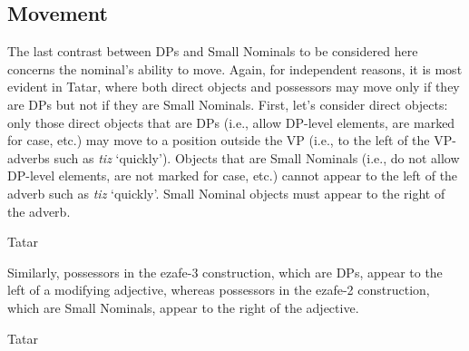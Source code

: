\documentclass[output=paper]{langsci/langscibook}
\begin{document}
\subsection{Movement}  %

The last contrast between DPs and Small Nominals to be considered here concerns the nominal’s ability to move. Again, for independent reasons, it is most evident in Tatar, where both direct objects and possessors may move only if they are DPs but not if they are Small Nominals. First, let’s consider direct objects: only those direct objects that are DPs (i.e., allow DP-level elements, are marked for case, etc.) may move to a position outside the VP (i.e., to the left of the VP-adverbs such as \textit{tiz} ‘quickly’). Objects that are Small Nominals (i.e., do not allow DP-level elements, are not marked for case, etc.) cannot appear to the left of the adverb such as \textit{tiz} ‘quickly’. Small Nominal objects must appear to the right of the adverb.

\ea%
    \label{pereex:17}
    Tatar 
    \z 
\z 

Similarly, possessors in the ezafe-3 construction, which are DPs, appear to the left of a modifying adjective, whereas possessors in the ezafe-2 construction, which are Small Nominals, appear to the right of the adjective.

\ea%
    \label{pereex:18}
    Tatar 
    \z
\z
\end{document}
